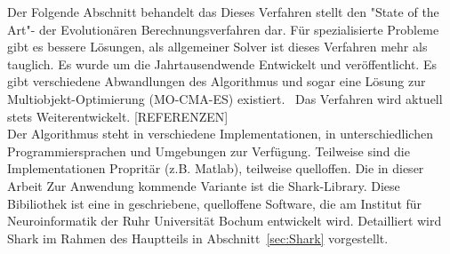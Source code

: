 Der Folgende Abschnitt behandelt das 
%
Dieses Verfahren stellt den "State of the Art"- der Evolutionären Berechnungsverfahren dar. Für spezialisierte Probleme gibt es bessere Lösungen, als allgemeiner Solver ist dieses Verfahren mehr als tauglich. Es wurde um die Jahrtausendwende Entwickelt und veröffentlicht. Es gibt verschiedene Abwandlungen des Algorithmus und sogar eine Lösung zur Multiobjekt-Optimierung (MO-CMA-ES) existiert.~\cite{HansenMOO:1} Das Verfahren wird aktuell stets Weiterentwickelt. [REFERENZEN]\\
%

Der Algorithmus steht in verschiedene Implementationen, in unterschiedlichen Programmiersprachen und Umgebungen zur Verfügung. Teilweise sind die Implementationen Propritär (z.B. Matlab), teilweise quelloffen. Die in dieser Arbeit Zur Anwendung kommende Variante ist die Shark-Library. Diese Bibiliothek ist eine in \cpp geschriebene, quelloffene Software, die am Institut für Neuroinformatik der Ruhr Universität Bochum entwickelt wird. Detailliert wird Shark im Rahmen des Hauptteils in Abschnitt~\ref{sec:Shark} vorgestellt.\\
%